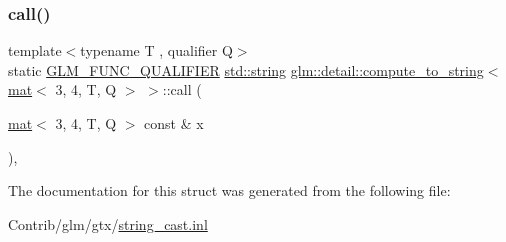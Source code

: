 \subsubsection{\texorpdfstring{call()}{call()}}
{\footnotesize\ttfamily template$<$typename T , qualifier Q$>$ \\
static \mbox{\hyperlink{setup_8hpp_a33fdea6f91c5f834105f7415e2a64407}{G\+L\+M\+\_\+\+F\+U\+N\+C\+\_\+\+Q\+U\+A\+L\+I\+F\+I\+ER}} \mbox{\hyperlink{_s_d_l__opengl__glext_8h_ae84541b4f3d8e1ea24ec0f466a8c568b}{std\+::string}} \mbox{\hyperlink{structglm_1_1detail_1_1compute__to__string}{glm\+::detail\+::compute\+\_\+to\+\_\+string}}$<$ \mbox{\hyperlink{structglm_1_1mat}{mat}}$<$ 3, 4, T, Q $>$ $>$\+::call (\begin{DoxyParamCaption}\item[{\mbox{\hyperlink{structglm_1_1mat}{mat}}$<$ 3, 4, T, Q $>$ const \&}]{x }\end{DoxyParamCaption})\hspace{0.3cm}{\ttfamily [inline]}, {\ttfamily [static]}}



The documentation for this struct was generated from the following file\+:\begin{DoxyCompactItemize}
\item 
Contrib/glm/gtx/\mbox{\hyperlink{string__cast_8inl}{string\+\_\+cast.\+inl}}\end{DoxyCompactItemize}
